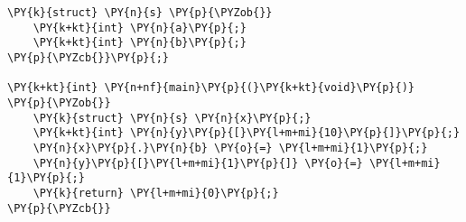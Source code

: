 \begin{Verbatim}[commandchars=\\\{\}]
\PY{k}{struct} \PY{n}{s} \PY{p}{\PYZob{}}
    \PY{k+kt}{int} \PY{n}{a}\PY{p}{;}
    \PY{k+kt}{int} \PY{n}{b}\PY{p}{;}
\PY{p}{\PYZcb{}}\PY{p}{;}

\PY{k+kt}{int} \PY{n+nf}{main}\PY{p}{(}\PY{k+kt}{void}\PY{p}{)}
\PY{p}{\PYZob{}}
    \PY{k}{struct} \PY{n}{s} \PY{n}{x}\PY{p}{;}
    \PY{k+kt}{int} \PY{n}{y}\PY{p}{[}\PY{l+m+mi}{10}\PY{p}{]}\PY{p}{;}
    \PY{n}{x}\PY{p}{.}\PY{n}{b} \PY{o}{=} \PY{l+m+mi}{1}\PY{p}{;}
    \PY{n}{y}\PY{p}{[}\PY{l+m+mi}{1}\PY{p}{]} \PY{o}{=} \PY{l+m+mi}{1}\PY{p}{;}
    \PY{k}{return} \PY{l+m+mi}{0}\PY{p}{;}
\PY{p}{\PYZcb{}}
\end{Verbatim}
